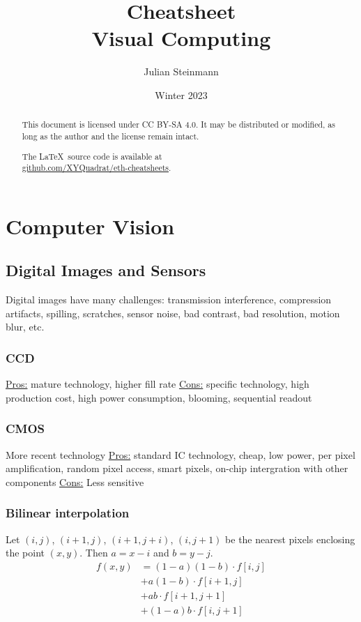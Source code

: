 \documentclass[a4paper,10pt]{article}
\title{Cheatsheet\\ Visual Computing}
\author{Julian Steinmann}
\date{\vspace{-10pt}Winter 2023}
\begin{document}
\maketitle

\renewcommand{\abstractname}{License}
\begin{abstract}
	This document is licensed under CC BY-SA 4.0. It may be distributed or modified, as long as the author and the license remain intact.

	\begin{center}
	    The \LaTeX\ source code is available at \\ \href{https://github.com/XYQuadrat/eth-cheatsheets}{\color{brandblue}github.com/XYQuadrat/eth-cheatsheets}.
	\end{center}
\end{abstract}

\section{Computer Vision}
\subsection{Digital Images and Sensors}
Digital images have many challenges: transmission interference, compression artifacts, spilling, scratches, sensor noise, bad contrast, bad resolution, motion blur, etc.

\subsubsection{CCD}
\underline{Pros:} mature technology, higher fill rate \quad
\underline{Cons:} specific technology, high production cost, high power consumption, blooming, sequential readout

\subsubsection{CMOS}
More recent technology \quad
\underline{Pros:} standard IC technology, cheap, low power, per pixel amplification, random pixel access, smart pixels, on-chip intergration with other components \quad
\underline{Cons:} Less sensitive

\subsubsection{Bilinear interpolation}
Let \((i, j)\), \((i + 1, j)\), \((i + 1, j + i)\), \((i, j + 1)\) be the nearest pixels enclosing the point \((x, y)\). Then \(a = x - i\) and \(b = y - j\).
\begin{align*}
    f(x, y) &= (1 - a)(1 - b) \cdot f[i, j]\\
    &+ a(1 - b) \cdot f[i + 1, j]\\
    &+ ab \cdot f[i + 1, j + 1]\\
    &+ (1 - a)b \cdot f[i, j + 1]
\end{align*}
\end{document}

